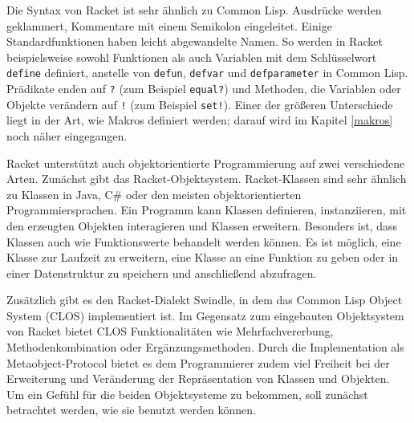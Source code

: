 Die Syntax von Racket ist sehr ähnlich zu Common Lisp. Ausdrücke werden geklammert, Kommentare mit einem Semikolon eingeleitet. Einige Standardfunktionen haben leicht abgewandelte Namen. So werden in Racket beispielsweise sowohl Funktionen als auch Variablen mit dem Schlüsselwort \texttt{define} definiert, anstelle von \texttt{defun}, \texttt{defvar} und \texttt{defparameter} in Common Lisp. Prädikate enden auf \texttt{?} (zum Beispiel \texttt{equal?}) und Methoden, die Variablen oder Objekte verändern auf \texttt{!} (zum Beispiel \texttt{set!}). Einer der größeren Unterschiede liegt in der Art, wie Makros definiert werden; darauf wird im Kapitel \ref{makros} noch näher eingegangen.

Racket unterstützt auch objektorientierte Programmierung auf zwei verschiedene Arten. Zunächst gibt das Racket-Objektsystem. Racket-Klassen sind sehr ähnlich zu Klassen in Java, C\# oder den meisten objektorientierten Programmiersprachen\cite{neu-edu}. Ein Programm kann Klassen definieren, instanziieren, mit den erzeugten Objekten interagieren und Klassen erweitern. Besonders ist, dass Klassen auch wie Funktionswerte behandelt werden können. Es ist möglich, eine Klasse zur Laufzeit zu erweitern, eine Klasse an eine Funktion zu geben oder in einer Datenstruktur zu speichern und anschließend abzufragen\cite{neu-edu}. 

Zusätzlich gibt es den Racket-Dialekt Swindle, in dem das Common Lisp Object System (CLOS) implementiert ist. Im Gegensatz zum eingebauten Objektsystem von Racket bietet CLOS Funktionalitäten wie Mehrfachvererbung, Methodenkombination oder Ergänzungsmethoden. Durch die Implementation als Metaobject-Protocol bietet es dem Programmierer zudem viel Freiheit bei der Erweiterung und Veränderung der Repräsentation von Klassen und Objekten.
Um ein Gefühl für die beiden Objektsysteme zu bekommen, soll zunächst betrachtet werden, wie sie benutzt werden können. %

